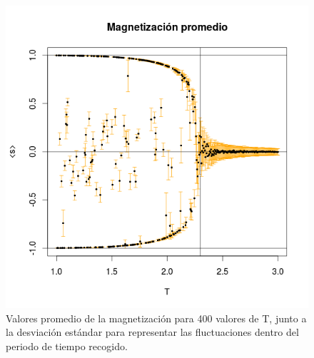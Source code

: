 \documentclass{scrartcl}
\begin{document}
\begin{figure}
\centering
\includegraphics[scale=0.7]{allT}
\caption{Valores promedio de la magnetización para 400 valores de T, junto a la desviación estándar para representar las fluctuaciones dentro del periodo de tiempo recogido.}
\label{fig:allT}
\end{figure}




\clearpage
\end{document}
